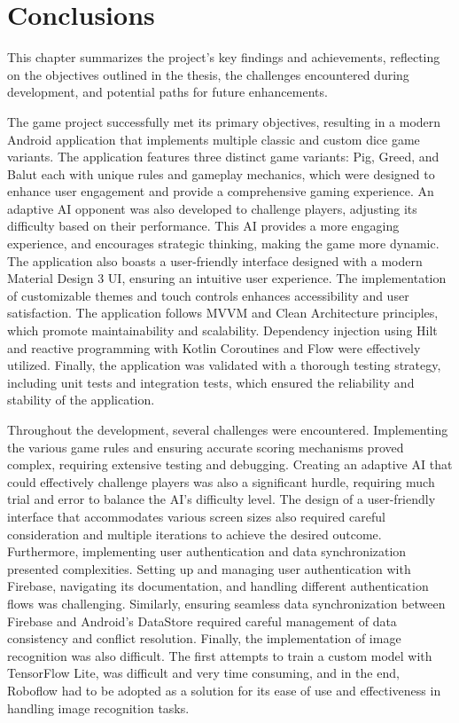 
\chapter{Conclusions}

This chapter summarizes the project's key findings and achievements, reflecting on the objectives outlined in the thesis, the challenges encountered during development, and potential paths for future enhancements.

The game project successfully met its primary objectives, resulting in a modern Android application that implements multiple classic and custom dice game variants. The application features three distinct game variants: Pig, Greed, and Balut each with unique rules and gameplay mechanics, which were designed to enhance user engagement and provide a comprehensive gaming experience. An adaptive AI opponent was also developed to challenge players, adjusting its difficulty based on their performance. This AI provides a more engaging experience, and encourages strategic thinking, making the game more dynamic. The application also boasts a user-friendly interface designed with a modern Material Design 3 UI, ensuring an intuitive user experience. The implementation of customizable themes and touch controls enhances accessibility and user satisfaction. The application follows MVVM and Clean Architecture principles, which promote maintainability and scalability.  Dependency injection using Hilt and reactive programming with Kotlin Coroutines and Flow were effectively utilized. Finally, the application was validated with a thorough testing strategy, including unit tests and integration tests, which ensured the reliability and stability of the application.

Throughout the development, several challenges were encountered. Implementing the various game rules and ensuring accurate scoring mechanisms proved complex, requiring extensive testing and debugging. Creating an adaptive AI that could effectively challenge players was also a significant hurdle, requiring much trial and error to balance the AI’s difficulty level. The design of a user-friendly interface that accommodates various screen sizes also required careful consideration and multiple iterations to achieve the desired outcome. Furthermore, implementing user authentication and data synchronization presented complexities. Setting up and managing user authentication with Firebase, navigating its documentation, and handling different authentication flows was challenging. Similarly, ensuring seamless data synchronization between Firebase and Android's DataStore required careful management of data consistency and conflict resolution. Finally, the implementation of image recognition was also difficult. The first attempts to train a custom model with TensorFlow Lite, was difficult and very time consuming, and in the end, Roboflow had to be adopted as a solution for its ease of use and effectiveness in handling image recognition tasks.

